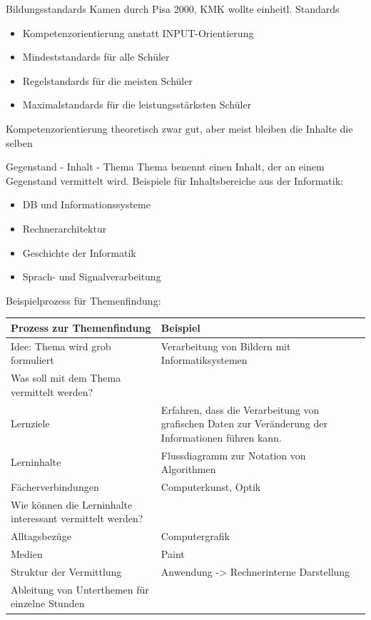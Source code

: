 \documentclass{article}
\begin{document}
\begin{block}{Bildungsstandards}
    Kamen durch Pisa 2000, KMK wollte einheitl. Standards
    \begin{itemize}
        \item Kompetenzorientierung anstatt INPUT-Orientierung
        \item Mindeststandards für alle Schüler
        \item Regelstandards für die meisten Schüler
        \item Maximalstandards für die leistungsstärksten Schüler
    \end{itemize}
    Kompetenzorientierung theoretisch zwar gut, aber meist bleiben die Inhalte die selben
\end{block}

\begin{block}{Gegenstand - Inhalt - Thema}
    Thema benennt einen Inhalt, der an einem Gegenstand vermittelt wird.
    Beispiele für Inhaltsbereiche aus der Informatik:
    \begin{itemize}
        \item DB und Informationssysteme
        \item Rechnerarchitektur
        \item Geschichte der Informatik
        \item Sprach- und Signalverarbeitung
    \end{itemize}
    Beispielprozess für Themenfindung:
    \begin{center}
        \begin{tabular}{|p{5cm}|p{5cm}|}
            \hline
            \textbf{Prozess zur Themenfindung} & \textbf{Beispiel} \\
            \hline
            Idee: Thema wird grob formuliert & Verarbeitung von Bildern mit Informatiksystemen \\
            \hline
            Was soll mit dem Thema vermittelt werden? & \\
            \hline
            Lernziele & Erfahren, dass die Verarbeitung von grafischen Daten zur Veränderung der Informationen führen kann. \\
            \hline
            Lerninhalte & Flussdiagramm zur Notation von Algorithmen \\
            \hline
            Fächerverbindungen & Computerkunst, Optik \\
            \hline
            Wie können die Lerninhalte interessant vermittelt werden? & \\
            \hline
            Alltagsbezüge & Computergrafik \\
            \hline
            Medien & Paint \\
            \hline
            Struktur der Vermittlung & Anwendung -> Rechnerinterne Darstellung \\
            \hline
            Ableitung von Unterthemen für einzelne Stunden & \\
            \hline
        \end{tabular}
    \end{center}
\end{block}
\end{document}
